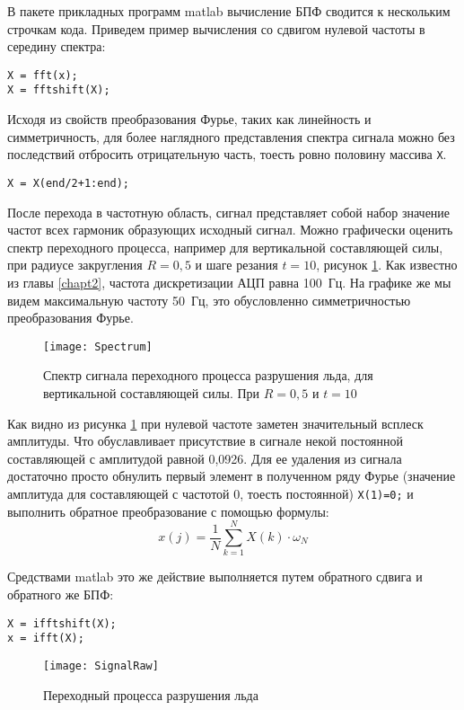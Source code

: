 В пакете прикладных программ matlab вычисление БПФ сводится к нескольким строчкам кода. Приведем пример вычисления со сдвигом нулевой частоты в середину спектра:
\begin{lstlisting}[stepnumber=0]
X = fft(x);
X = fftshift(X);
\end{lstlisting}

Исходя из свойств преобразования Фурье, таких как линейность и симметричность, для более наглядного представления спектра сигнала можно без последствий отбросить отрицательную часть, тоесть ровно половину массива \verb|X|. 
\begin{lstlisting}[stepnumber=0]
X = X(end/2+1:end);
\end{lstlisting}

После перехода в частотную область, сигнал представляет собой набор значение частот всех гармоник образующих исходный сигнал. Можно графически оценить спектр переходного процесса, например для вертикальной составляющей силы, при радиусе закругления $ R=0,5 $ и шаге резания $ t=10 $, рисунок \ref{img:Spectrum}. Как известно из главы \ref{chapt2}, частота дискретизации АЦП равна 100~Гц. На графике же мы видем максимальную частоту 50~Гц, это обусловленно симметричностью преобразования Фурье. 
\begin{figure}[ht] 
	\center
	\texttt{[image: Spectrum]}
	\caption{Спектр сигнала переходного процесса разрушения льда, для вертикальной составляющей силы. При $ R=0,5 $ и $ t=10 $} 
	\label{img:Spectrum}  
\end{figure}

Как видно из рисунка \ref{img:Spectrum} при нулевой частоте заметен значительный всплеск амплитуды. Что обуславливает присутствие в сигнале некой постоянной составляющей с амплитудой равной 0,0926.  Для ее удаления из сигнала достаточно просто обнулить первый элемент в полученном ряду Фурье (значение амплитуда для составляющей с частотой 0, тоесть постоянной) \lstinline{X(1)=0;} и выполнить обратное преобразование с помощью формулы:
\begin{equation}\label{eq:iFFT}
x(j)=\frac{1}{N}\sum_{k=1}^{N} X(k)\cdot\omega_{N}
\end{equation}

Средствами matlab это же действие выполняется путем обратного сдвига и обратного же БПФ:
\begin{lstlisting}[stepnumber=0]
X = ifftshift(X);
x = ifft(X);
\end{lstlisting}
\begin{figure}[ht] 
	\center
	\texttt{[image: SignalRaw]}
	\caption{Переходный процесса разрушения льда} 
	\label{img:SignalRaw}  
\end{figure}

